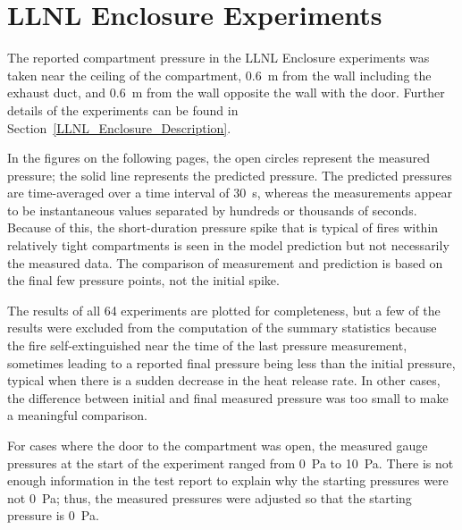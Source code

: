 \clearpage

\section{LLNL Enclosure Experiments}

The reported compartment pressure in the LLNL Enclosure experiments was taken near the ceiling of the compartment, 0.6~m from the wall including the exhaust duct, and 0.6~m from the wall opposite the wall with the door. Further details of the experiments can be found in Section~\ref{LLNL_Enclosure_Description}.

In the figures on the following pages, the open circles represent the measured pressure; the solid line represents the predicted pressure. The predicted pressures are time-averaged over a time interval of 30~s, whereas the measurements appear to be instantaneous values separated by hundreds or thousands of seconds. Because of this, the short-duration pressure spike that is typical of fires within relatively tight compartments is seen in the model prediction but not necessarily the measured data. The comparison of measurement and prediction is based on the final few pressure points, not the initial spike.

The results of all 64 experiments are plotted for completeness, but a few of the results were excluded from the computation of the summary statistics because the fire self-extinguished near the time of the last pressure measurement, sometimes leading to a reported final pressure being less than the initial pressure, typical when there is a sudden decrease in the heat release rate. In other cases, the difference between initial and final measured pressure was too small to make a meaningful comparison.

For cases where the door to the compartment was open, the measured gauge pressures at the start of the experiment ranged from 0~Pa to 10~Pa. There is not enough information in the test report to explain why the starting pressures were not 0~Pa; thus, the measured pressures were adjusted so that the starting pressure is 0~Pa.

